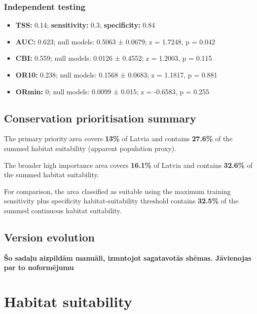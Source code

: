 \documentclass[
  openany]{book}
\providecommand{\tightlist}{%
  \setlength{\itemsep}{0pt}\setlength{\parskip}{0pt}}
\providecommand{\tightlist}{%
  \setlength{\itemsep}{0pt}%
  \setlength{\parskip}{0pt}%
}
\begin{document}
\subsubsection*{Independent testing}\label{independent-testing-16}

\begin{itemize}
\tightlist
\item
  \textbf{TSS:} 0.14; \textbf{sensitivity:} 0.3; \textbf{specificity:} 0.84
\item
  \textbf{AUC:} 0.623; null models: 0.5063 ± 0.0679; z = 1.7248, p = 0.042
\item
  \textbf{CBI:} 0.559; null models: 0.0126 ± 0.4552; z = 1.2003, p = 0.115
\item
  \textbf{OR10:} 0.238; null models: 0.1568 ± 0.0683; z = 1.1817, p = 0.881
\item
  \textbf{ORmin:} 0; null models: 0.0099 ± 0.015; z = -0.6583, p = 0.255
\end{itemize}

\subsection*{Conservation prioritisation summary}\label{conservation-prioritisation-summary-16}

The primary priority area covers \textbf{13\%} of Latvia and contains \textbf{27.6\%} of the summed habitat suitability (apparent population proxy).

The broader high importance area covers \textbf{16.1\%} of Latvia and contains \textbf{32.6\%} of the summed habitat suitability.

For comparison, the area classified as suitable using the maximum training sensitivity plus specificity habitat-suitability threshold contains \textbf{32.5\%} of the summed continuous habitat suitability.

\subsection*{Version evolution}\label{version-evolution-16}

\textbf{Šo sadaļu aizpildām manuāli, izmntojot sagatavotās shēmas. Jāvienojas par to noformējumu}

\section*{Habitat suitability}\label{habitat-suitability-16}
\end{document}
